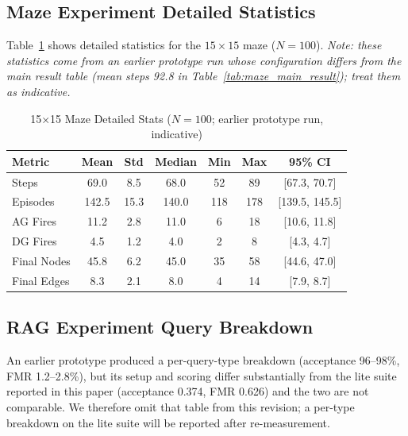 \documentclass[12pt]{article}
\begin{document}
\subsection{Maze Experiment Detailed Statistics}
Table~\ref{tab:maze_detail_15} shows detailed statistics for the $15{\times}15$ maze ($N=100$).
\textit{Note: these statistics come from an earlier prototype run whose configuration differs from the main result table (mean steps 92.8 in Table~\ref{tab:maze_main_result}); treat them as indicative.}
\begin{table}[H]
    \centering
    \caption{15×15 Maze Detailed Stats ($N=100$; earlier prototype run, indicative)}
    \label{tab:maze_detail_15}
    \small
    \begin{tabular}{lcccccc}
    \toprule
    Metric & Mean & Std & Median & Min & Max & 95\% CI \\
    \midrule
    Steps & 69.0 & 8.5 & 68.0 & 52 & 89 & [67.3, 70.7] \\
    Episodes & 142.5 & 15.3 & 140.0 & 118 & 178 & [139.5, 145.5] \\
    AG Fires & 11.2 & 2.8 & 11.0 & 6 & 18 & [10.6, 11.8] \\
    DG Fires & 4.5 & 1.2 & 4.0 & 2 & 8 & [4.3, 4.7] \\
    Final Nodes & 45.8 & 6.2 & 45.0 & 35 & 58 & [44.6, 47.0] \\
    Final Edges & 8.3 & 2.1 & 8.0 & 4 & 14 & [7.9, 8.7] \\
    \bottomrule
    \end{tabular}
\end{table}

\subsection{RAG Experiment Query Breakdown}
An earlier prototype produced a per-query-type breakdown (acceptance 96--98\%, FMR 1.2--2.8\%), but its setup and scoring differ substantially from the lite suite reported in this paper (acceptance 0.374, FMR 0.626) and the two are not comparable. We therefore omit that table from this revision; a per-type breakdown on the lite suite will be reported after re-measurement.
\end{document}
